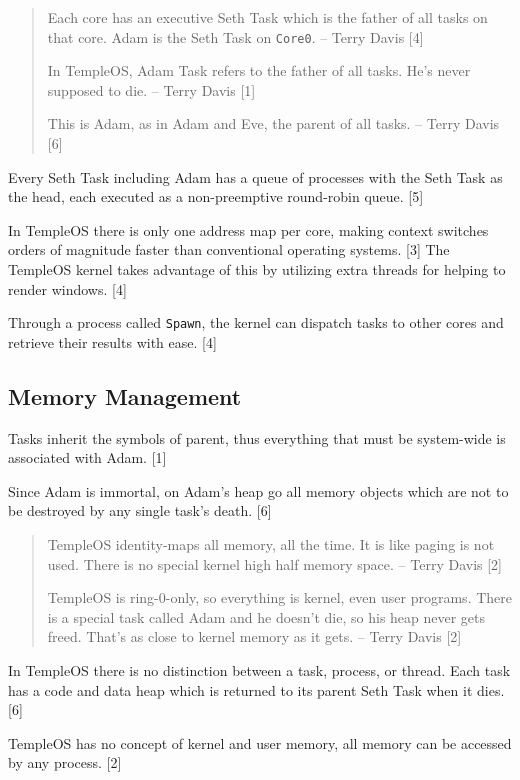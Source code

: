 \documentclass[11pt]{article}
\begin{document}
\begin{quote}
Each core has an executive Seth Task which is the father of all tasks on that
core. Adam is the Seth Task on \texttt{Core0}. -- Terry Davis [4]

In TempleOS, Adam Task refers to the father of all tasks. He's never supposed to
die. -- Terry Davis [1]

This is Adam, as in Adam and Eve, the parent of all tasks. -- Terry Davis [6]
\end{quote}

Every Seth Task including Adam has a queue of processes with the Seth Task as
the head, each executed as a non-preemptive round-robin queue. [5]

In TempleOS there is only one address map per core, making context switches
orders of magnitude faster than conventional operating systems. [3] The TempleOS
kernel takes advantage of this by utilizing extra threads for helping to render
windows. [4]

Through a process called \texttt{Spawn}, the kernel can dispatch tasks to other cores
and retrieve their results with ease. [4]

 \newpage

\subsection{Memory Management}
\label{sec:org17ab9a7}

Tasks inherit the symbols of parent, thus everything that must be system-wide is
associated with Adam. [1]

Since Adam is immortal, on Adam's heap go all memory objects which are not to be
destroyed by any single task's death. [6]

\begin{quote}
TempleOS identity-maps all memory, all the time. It is like paging is not
used. There is no special kernel high half memory space. -- Terry Davis [2]

TempleOS is ring-0-only, so everything is kernel, even user programs. There is a
special task called Adam and he doesn't die, so his heap never gets
freed. That's as close to kernel memory as it gets. -- Terry Davis [2]
\end{quote}

In TempleOS there is no distinction between a task, process, or thread. Each
task has a code and data heap which is returned to its parent Seth Task when it
dies. [6]

TempleOS has no concept of kernel and user memory, all memory can be accessed by
any process. [2]
\end{document}
